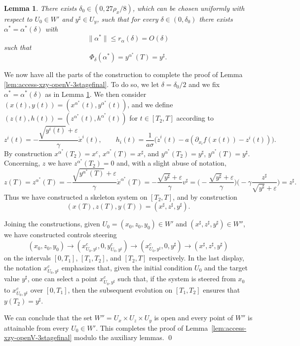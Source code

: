\documentclass[11pt, a4paper,leqno]{amsart}
\newtheorem{lemma}{Lemma}[section]
\theoremstyle{definition}
\numberwithin{equation}{section}
\begin{document}
\begin{lemma}\label{CdG+}
There exists $\delta_0\in (0,27\rho_x/8)$, which can be chosen uniformly with respect to
$U_0\in W'$ and $y^\sharp\in U_y$, such that for every $\delta\in(0,\delta_0)$
there exists $\alpha^\ast=\alpha^\ast(\delta)$ with
\[
\|\alpha^\ast\|\le r_\alpha(\delta)=O(\delta)
\]
such that
\[
\Phi_\delta(\alpha^\ast)
=
y^{\alpha^\ast}(T)=
y^\sharp.
\]
\end{lemma}




We now have all the parts of the construction to complete the proof of Lemma \ref{lem:access-xzy-openV-3stagefinal}. To do so, we let $\delta=\delta_0/2$ and we fix \(\alpha^\ast=\alpha^\ast(\delta)\) as in Lemma \ref{CdG+}. We then consider $(x(t),y(t))=(x^{\alpha^\ast}(t),y^{\alpha^\ast}(t))$, and we define $(z(t),h(t))=(z^{\alpha^\ast}(t),h^{\alpha^\ast}(t))$ for \(t\in[T_2,T]\) according to
\[
z^i(t)
=
-\frac{\sqrt{y^i(t)}+\varepsilon}{\gamma}\dot x^i(t),
\qquad
h_i(t)
=
\frac{1}{a\sigma}
\Big(\dot z^i(t)-a(\partial_{x_i}f(x(t))-z^i(t))\Big).
\]
By construction $x^{\alpha^\ast}(T_2)=x^c$, $x^{\alpha^\ast}(T)=x^\sharp$, and $y^{\alpha^\ast}(T_2)=y^\sharp$, $y^{\alpha^\ast}(T)=y^\sharp$. Concerning, $z$ we have $z^{\alpha^\ast}(T_2)=0$ and, with a slight abuse of notation,
$$z(T)=z^{\alpha^\ast}(T)=
-\frac{\sqrt{y^{\alpha^\ast}(T)}+\varepsilon}{\gamma}\dot x^{\alpha^\ast}(T)=-\frac{\sqrt{y^\sharp}+\varepsilon}{\gamma} v^\sharp=\bigl(-\frac{\sqrt{y^\sharp}+\varepsilon}{\gamma}\bigr)\bigl (-\gamma\frac{z^\sharp}{\sqrt{y^\sharp}+\varepsilon}\bigr )=z^\sharp.$$
Thus we have constructed a skeleton system  on \([T_2,T]\), and by construction
\[
(x(T),z(T),y(T))=(x^\sharp,z^\sharp,y^\sharp).
\]

Joining the constructions, given $U_0=(x_0,z_0,y_0)\in W'$ and $(x^\sharp,z^\sharp,y^\sharp)\in W''$, we have constructed controls steering
$$(x_0,z_0,y_0)\to (x^c_{U_0,y^\sharp},0,y^c_{U_0,y^\sharp})\to (x^c_{U_0,y^\sharp},0,y^\sharp)\to (x^\sharp,z^\sharp,y^\sharp)$$
on the intervals $[0,T_1]$, $[T_1,T_2]$, and $[T_2,T]$ respectively. In the last display, the notation $x^c_{U_0,y^\sharp}$ emphasizes that,
given the initial condition $U_0$ and the target value $y^\sharp$,
one can select a point $x^c_{U_0,y^\sharp}$ such that, if the system is steered from $x_0$ to $x^c_{U_0,y^\sharp}$ over $[0,T_1]$, then the subsequent evolution on $[T_1,T_2]$ ensures that $y(T_2)=y^\sharp$.




We can conclude that the set $W''=U_x\times U_z\times U_y$
is open and every point of \(W''\) is attainable from every
\(U_0\in W'\).
This completes the proof of Lemma~\ref{lem:access-xzy-openV-3stagefinal}
modulo the auxiliary lemmas. \qed
\end{document}
